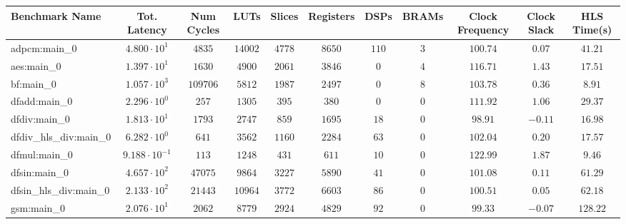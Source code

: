 \begin{tabular}{|l|c|c|c|c|c|c|c|c|c|c|}
\hline
Benchmark Name          & Tot. Latency            & Num Cycles & LUTs      & Slices    & Registers & DSPs    & BRAMs  & Clock Frequency & Clock Slack & HLS Time(s) \\
\hline
adpcm:main\_0           & $ 4.800 \cdot 10^{1}  $ & $ 4835   $ & $ 14002 $ & $ 4778  $ & $ 8650  $ & $ 110 $ & $ 3  $ & $ 100.74      $ & $ 0.07    $ & $ 41.21   $ \\
aes:main\_0             & $ 1.397 \cdot 10^{1}  $ & $ 1630   $ & $ 4900  $ & $ 2061  $ & $ 3846  $ & $ 0   $ & $ 4  $ & $ 116.71      $ & $ 1.43    $ & $ 17.51   $ \\
bf:main\_0              & $ 1.057 \cdot 10^{3}  $ & $ 109706 $ & $ 5812  $ & $ 1987  $ & $ 2497  $ & $ 0   $ & $ 8  $ & $ 103.78      $ & $ 0.36    $ & $ 8.91    $ \\
dfadd:main\_0           & $ 2.296 \cdot 10^{0}  $ & $ 257    $ & $ 1305  $ & $ 395   $ & $ 380   $ & $ 0   $ & $ 0  $ & $ 111.92      $ & $ 1.06    $ & $ 29.37   $ \\
dfdiv:main\_0           & $ 1.813 \cdot 10^{1}  $ & $ 1793   $ & $ 2747  $ & $ 859   $ & $ 1695  $ & $ 18  $ & $ 0  $ & $ 98.91       $ & $ -0.11   $ & $ 16.98   $ \\
dfdiv\_hls\_div:main\_0 & $ 6.282 \cdot 10^{0}  $ & $ 641    $ & $ 3562  $ & $ 1160  $ & $ 2284  $ & $ 63  $ & $ 0  $ & $ 102.04      $ & $ 0.20    $ & $ 17.57   $ \\
dfmul:main\_0           & $ 9.188 \cdot 10^{-1} $ & $ 113    $ & $ 1248  $ & $ 431   $ & $ 611   $ & $ 10  $ & $ 0  $ & $ 122.99      $ & $ 1.87    $ & $ 9.46    $ \\
dfsin:main\_0           & $ 4.657 \cdot 10^{2}  $ & $ 47075  $ & $ 9864  $ & $ 3227  $ & $ 5890  $ & $ 41  $ & $ 0  $ & $ 101.08      $ & $ 0.11    $ & $ 61.29   $ \\
dfsin\_hls\_div:main\_0 & $ 2.133 \cdot 10^{2}  $ & $ 21443  $ & $ 10964 $ & $ 3772  $ & $ 6603  $ & $ 86  $ & $ 0  $ & $ 100.51      $ & $ 0.05    $ & $ 62.18   $ \\
gsm:main\_0             & $ 2.076 \cdot 10^{1}  $ & $ 2062   $ & $ 8779  $ & $ 2924  $ & $ 4829  $ & $ 92  $ & $ 0  $ & $ 99.33       $ & $ -0.07   $ & $ 128.22  $ \\

\end{tabular}
